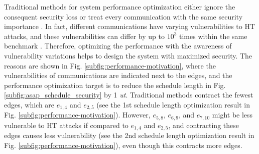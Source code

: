\documentclass[10pt,journal, compsoc]{IEEEtran}
\begin{document}
Traditional methods for system performance optimization either ignore the consequent security loss \cite{article:CL} or treat every communication with the same security importance \cite{article:NW, conference:NW}. In fact, different communications have varying vulnerabilities to HT attacks, and these vulnerabilities can differ by up to $10^3$ times within the same benchmark \cite{conference:HS}. Therefore, optimizing the performance with the awareness of vulnerability variations helps to design the system with maximized security. The reasons are shown in Fig. \ref{subfig:performance-motivation}, where the vulnerabilities of communications are indicated next to the edges, and the performance optimization target is to reduce the schedule length in Fig. \ref{subfig:asap_schedule_security} by 1 \textit{ut}. Traditional methods \cite{article:NW, conference:NW} contract the fewest edges, which are $e_{1,4}$ and $e_{2,5}$ (see the 1st schedule length optimization result in Fig. \ref{subfig:performance-motivation}). However, $e_{5,8}$, $e_{6,9}$, and $e_{7,10}$ might be less vulnerable to HT attacks if compared to $e_{1,4}$ and $e_{2,5}$, and contracting these edges causes less vulnerability (see the 2nd schedule length optimization result in Fig. \ref{subfig:performance-motivation}), even though this contracts more edges.
\end{document}
